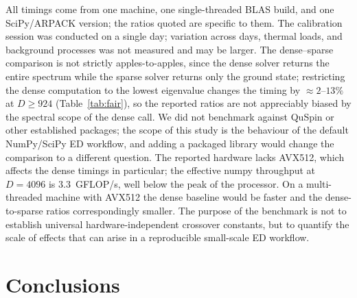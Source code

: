 \documentclass[pdflatex,sn-mathphys-num]{sn-jnl}
\begin{document}
All timings come from one machine, one single-threaded BLAS build, and
one SciPy/ARPACK version; the ratios quoted are specific to them. The
calibration session was conducted on a single day; variation across
days, thermal loads, and background processes was not measured and
may be larger. The dense--sparse comparison is not strictly
apples-to-apples, since the dense solver returns the entire spectrum
while the sparse solver returns only the ground state; restricting
the dense computation to the lowest eigenvalue changes the timing by
$\approx 2$--$13\%$ at $D \geq 924$ (Table~\ref{tab:fair}), so the
reported ratios are not appreciably biased by the spectral scope of
the dense call. We did not benchmark against QuSpin or other
established packages; the scope of this study is the behaviour of
the default NumPy/SciPy ED workflow, and adding a packaged library
would change the comparison to a different question. The reported
hardware lacks AVX512, which affects the dense timings in
particular; the effective numpy throughput at $D=4096$ is
$3.3$~GFLOP/s, well below the peak of the processor. On a
multi-threaded machine with AVX512 the dense baseline would be faster
and the dense-to-sparse ratios correspondingly smaller. The purpose
of the benchmark is not to establish universal hardware-independent
crossover constants, but to quantify the scale of effects that can
arise in a reproducible small-scale ED workflow.

\section{Conclusions}
\label{sec:conclusions}
\end{document}
